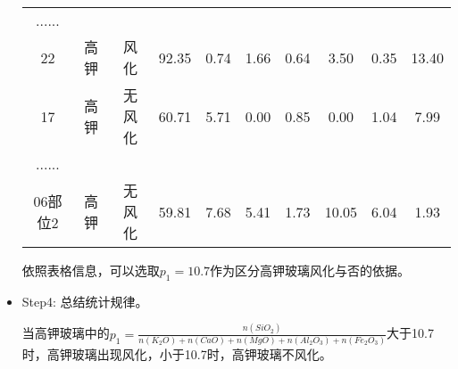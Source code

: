 \documentclass[withoutpreface,bwprint]{cumcmthesis} %
\begin{document}
\begin{itemize}
\begin{table}[!h]
\begin{tabular}{@{}cccccccccc@{}}
			......         &    &    &    &    &    &                       \\
			22                                                        & 高钾          & 风化                                                       & 92.35                                                          & 0.74                                                         & 1.66                                                         & 0.64                                                         & 3.50                                                           & 0.35                                                           & 13.40                                                           \\
			17                                                        & 高钾          & 无风化                                                      & 60.71                                                          & 5.71                                                         & 0.00                                                         & 0.85                                                         & 0.00                                                           & 1.04                                                           & 7.99                                                            \\
			......         &    &    &    &    &    &                       \\
			06部位2                                                     & 高钾          & 无风化                                                      & 59.81                                                          & 7.68                                                         & 5.41                                                         & 1.73                                                         & 10.05                                                          & 6.04                                                           & 1.93                                                            \\ \bottomrule
		\end{tabular}
	\end{table}
	
	
	依照表格信息，可以选取$p_{1}=10.7$作为区分高钾玻璃风化与否的依据。
	
	\item Step4: 总结统计规律。
	
	
	 当高钾玻璃中的$p_{1}=\frac{n(SiO_{2})}{n(K_{2}O)+n(CaO)+n(MgO)+n(Al_{2}O_{3})+n(Fe_{2}O_{3})}$大于10.7时，高钾玻璃出现风化，小于10.7时，高钾玻璃不风化。
	
\end{itemize}
\end{document}
